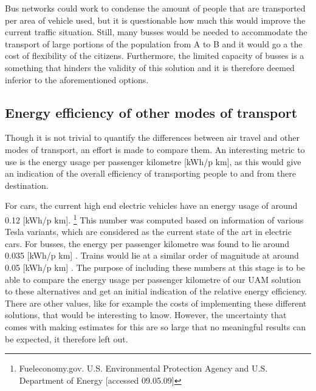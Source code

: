 Bus networks could work to condense the amount of people that are transported per area of vehicle used, but it is questionable how much this would improve the current traffic situation. Still, many busses would be needed to accommodate the transport of large portions of the population from A to B and it would go a the cost of flexibility of the citizens. Furthermore, the limited capacity of busses is a something that hinders the validity of this solution and it is therefore deemed inferior to the aforementioned options.  


\subsection{Energy efficiency of other modes of transport}
Though it is not trivial to quantify the differences between air travel and other modes of transport, an effort is made to compare them. An interesting metric to use is the energy usage per passenger kilometre [kWh/p km], as this would give an indication of the overall efficiency of transporting people to and from there destination.

For cars, the current high end electric vehicles have an energy usage of around 0.12 [kWh/p km]. \footnote{Fueleconomy.gov. U.S. Environmental Protection Agency and U.S. Department of Energy [accessed 09.05.09]} This number was computed based on information of various Tesla variants, which are considered as the current state of the art in electric cars. For busses, the energy per passenger kilometre was found to lie around 0.035 [kWh/p km] \cite{TNOstuff} \citep{Latvianstuff}. Trains would lie at a similar order of magnitude at around 0.05 [kWh/p km] \cite{Trainstuff}. The purpose of including these numbers at this stage is to be able to compare the energy usage per passenger kilometre of our UAM solution to these alternatives and get an initial indication of the relative energy efficiency. There are other values, like for example the costs of implementing these different solutions, that would be interesting to know. However, the uncertainty that comes with making estimates for this are so large that no meaningful results can be expected, it therefore left out. 








